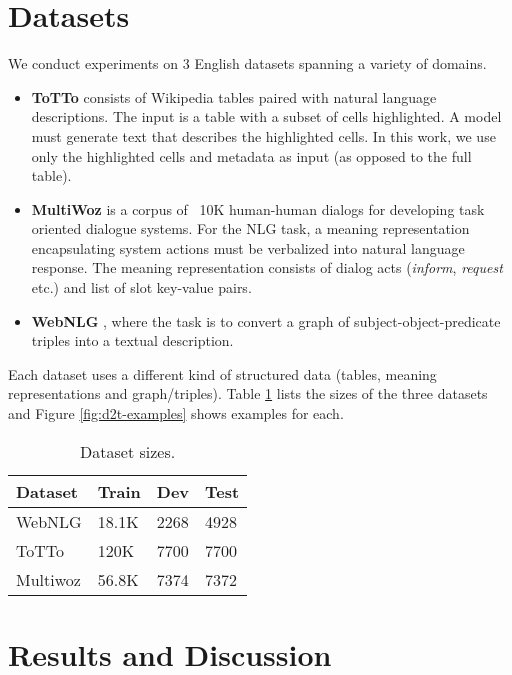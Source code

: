 \documentclass[11pt,a4paper]{article}
\begin{document}
\section{Datasets}
We conduct experiments on 3 English datasets spanning a variety of domains.
\begin{itemize}
    \item \textbf{ToTTo} \cite{parikh2020totto} consists of Wikipedia tables paired with natural language descriptions. The input is a table with a subset of cells highlighted. A model must generate text that describes the highlighted cells. In this work, we use only the highlighted cells and metadata as input (as opposed to the full table).
    \item \textbf{MultiWoz} \cite{budzianowski2018multiwoz} is a corpus of ~10K human-human dialogs for developing task oriented dialogue systems. For the NLG task, a meaning representation encapsulating system actions must be verbalized into natural language response. The meaning representation consists of dialog acts (\textit{inform}, \textit{request} etc.) and list of slot key-value pairs.
    \item \textbf{WebNLG} \cite{gardent2017webnlg}, where the task is to convert a graph of subject-object-predicate triples into a textual description.
\end{itemize}
\par Each dataset uses a different kind of structured data (tables, meaning representations and graph/triples).
Table \ref{dataset-stats} lists the sizes of the three datasets and Figure \ref{fig:d2t-examples} shows examples for each.


\begin{table}[h]
\centering
\begin{tabular}{l|l|l|l}  \hline
Dataset  & Train  & Dev  & Test \\ \hline
WebNLG   & 18.1K  & 2268 & 4928 \\
ToTTo    & 120K & 7700 & 7700 \\
Multiwoz & 56.8K  & 7374 & 7372  \\ \hline
\end{tabular}
\label{dataset-stats}
\caption{Dataset sizes.}
\end{table}



\section{Results and Discussion} 
\end{document}
